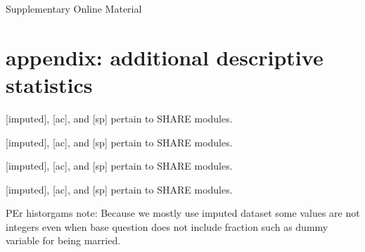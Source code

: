 \documentclass[10pt, letterpaper]{article}
\begin{document}
\begin{spacing}{1.4}









{\huge Supplementary Online Material}

\section{appendix: additional descriptive statistics}

 
{\footnotesize [imputed], [ac], and [sp] pertain to SHARE modules.}
 
{\footnotesize [imputed], [ac], and [sp] pertain to SHARE modules.}
 
{\footnotesize [imputed], [ac], and [sp] pertain to SHARE modules.}
 
{\footnotesize [imputed], [ac], and [sp] pertain to SHARE modules.}

PEr historgams note: Because we mostly use imputed dataset some values are not integers even when base
question does not include fraction such as dummy variable for being married. 



\end{spacing}
\end{document}
